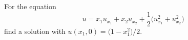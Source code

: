 \begin{problem}
  For the equation
  \[
    u=x_1u_{x_1}+x_2u_{x_2}
    +\frac{1}{2}\bigl(u_{x_1}^2+u_{x_2}^2\bigr)
  \]
  find a solution with \(u(x_1,0)=\bigl(1-x_1^2\bigr)/2\).
\end{problem}
\begin{solution}

\end{solution}

